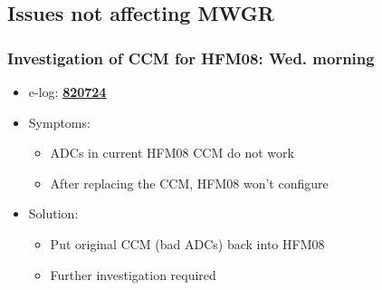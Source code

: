\documentclass[bigger]{beamer}
\providecommand{\alert}[1]{\textbf{#1}}
\begin{document}
\subsection{Issues not affecting MWGR}
\label{sec-3-1}
\begin{frame}
\frametitle{Investigation of CCM for HFM08: Wed. morning}
\label{sec-3-1-1}
\begin{itemize}

\item e-log: \href{http://cmsonline.cern.ch/cms-elog/820724}{\alert{820724}}
\label{sec-3-1-1-1}%

\item Symptoms:
\label{sec-3-1-1-2}%
\begin{itemize}

\item ADCs in current HFM08 CCM do not work
\label{sec-3-1-1-2-1}%

\item After replacing the CCM, HFM08 won't configure
\label{sec-3-1-1-2-2}%
\end{itemize} %

\item Solution:
\label{sec-3-1-1-3}%
\begin{itemize}

\item Put original CCM (bad ADCs) back into HFM08
\label{sec-3-1-1-3-1}%

\item Further investigation required
\label{sec-3-1-1-3-2}%
\end{itemize} %
\end{itemize} %
\end{frame}
\end{document}
